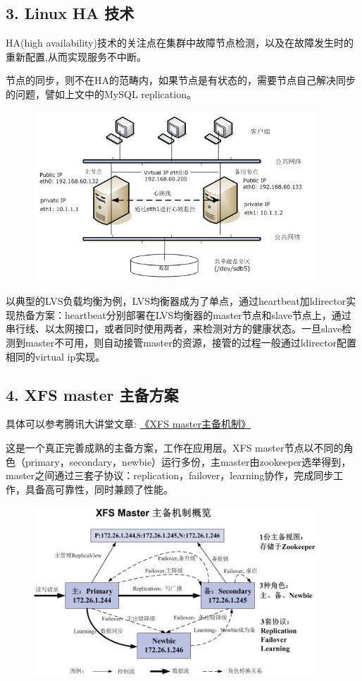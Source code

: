 {    \subsection* {3. Linux HA 技术}{
        {HA(high availability)技术的关注点在集群中故障节点检测，以及在故障发生时的重新配置,从而实现服务不中断。}\par
        {节点的同步，则不在HA的范畴内，如果节点是有状态的，需要节点自己解决同步的问题，譬如上文中的MySQL replication。}\par
        \begin {figure}[htbp]
            \centering
            \includegraphics [width=300pt, keepaspectratio] {heartbeat_ha.png}
        \end {figure}
        {以典型的LVS负载均衡为例，LVS均衡器成为了单点，通过heartbeat加ldirector实现热备方案：heartbeat分别部署在LVS均衡器的master节点和slave节点上，通过串行线、以太网接口，或者同时使用两者，来检测对方的健康状态。一旦slave检测到master不可用，则自动接管master的资源，接管的过程一般通过ldirector配置相同的virtual ip实现。}\par
    }

    \subsection* {4. XFS master 主备方案}{
        {具体可以参考腾讯大讲堂文章: \href{http://djt.qq.com/article/view/322}{《XFS master主备机制》}}\par
        {这是一个真正完善成熟的主备方案，工作在应用层。XFS master节点以不同的角色（primary，secondary，newbie）运行多份，主master由zookeeper选举得到，master之间通过三套子协议：replication，failover，learning协作，完成同步工作，具备高可靠性，同时兼顾了性能。}\par
        \begin {figure}[htbp]
            \centering
            \includegraphics [width=300pt, keepaspectratio] {xfs_master.png}
        \end {figure}
    }
}


